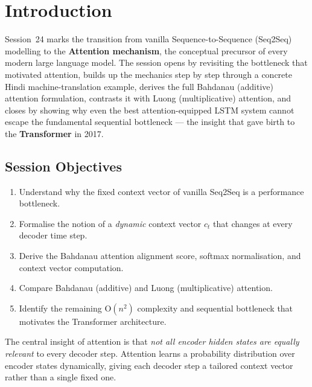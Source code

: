 \documentclass[12pt,a4paper]{article}
\newcommand{\ct}{c_t}
\begin{document}

\newpage

\section{Introduction}
\label{sec:intro}

Session~24 marks the transition from vanilla Sequence-to-Sequence
(Seq2Seq) modelling to the \textbf{Attention mechanism}, the
conceptual precursor of every modern large language model.  The
session opens by revisiting the bottleneck that motivated attention,
builds up the mechanics step by step through a concrete Hindi
machine-translation example, derives the full Bahdanau (additive)
attention formulation, contrasts it with Luong (multiplicative)
attention, and closes by showing why even the best attention-equipped
LSTM system cannot escape the fundamental sequential bottleneck ---
the insight that gave birth to the \textbf{Transformer} in 2017.

\subsection*{Session Objectives}
\begin{enumerate}[label=\arabic*.]
  \item Understand why the fixed context vector of vanilla Seq2Seq
        is a performance bottleneck.
  \item Formalise the notion of a \emph{dynamic} context vector
        $\ct$ that changes at every decoder time step.
  \item Derive the Bahdanau attention alignment score, softmax
        normalisation, and context vector computation.
  \item Compare Bahdanau (additive) and Luong (multiplicative)
        attention.
  \item Identify the remaining O$(n^{2})$ complexity and sequential
        bottleneck that motivates the Transformer architecture.
\end{enumerate}

\begin{keyinsight}[title=Session Theme]
  The central insight of attention is that \emph{not all encoder
  hidden states are equally relevant} to every decoder step.
  Attention learns a probability distribution over encoder states
  dynamically, giving each decoder step a tailored context vector
  rather than a single fixed one.
\end{keyinsight}
\end{document}
